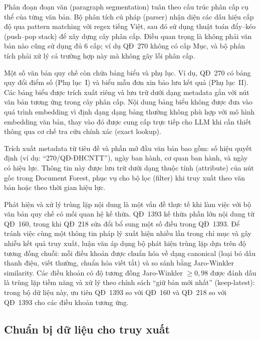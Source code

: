 Phân đoạn đoạn văn (paragraph segmentation) tuân theo cấu trúc phân cấp cụ thể
của từng văn bản. Bộ phân tích cú pháp (parser) nhận diện các dấu hiệu cấp độ
qua pattern matching với regex tiếng Việt, sau đó sử dụng thuật toán đẩy--kéo
(push--pop stack) để xây dựng cây phân cấp. Điều quan trọng là không phải văn
bản nào cũng sử dụng đủ 6 cấp; ví dụ QĐ~270 không có cấp Mục, và bộ phân tích
phải xử lý cả trường hợp này mà không gây lỗi phân cấp.

Một số văn bản quy chế còn chứa bảng biểu và phụ lục. Ví dụ, QĐ~270 có bảng
quy đổi điểm số (Phụ lục~I) và biểu mẫu đơn xin bảo lưu kết quả (Phụ lục~II).
Các bảng biểu được trích xuất riêng và lưu trữ dưới dạng metadata gắn với nút
văn bản tương ứng trong cây phân cấp. Nội dung bảng biểu không được đưa vào quá
trình embedding vì định dạng dạng bảng thường không phù hợp với mô hình embedding
văn bản, thay vào đó được cung cấp trực tiếp cho LLM khi cần thiết thông qua
cơ chế tra cứu chính xác (exact lookup).

Trích xuất metadata từ tiêu đề và phần mở đầu văn bản bao gồm: số hiệu quyết
định (ví dụ: ``270/QĐ-ĐHCNTT''), ngày ban hành, cơ quan ban hành, và ngày có
hiệu lực. Thông tin này được lưu trữ dưới dạng thuộc tính (attribute) của nút
gốc trong Document Forest, phục vụ cho bộ lọc (filter) khi truy xuất theo văn
bản hoặc theo thời gian hiệu lực.

Phát hiện và xử lý trùng lặp nội dung là một vấn đề thực tế khi làm việc với
bộ văn bản quy chế có mối quan hệ kế thừa. QĐ~1393 kế thừa phần lớn nội dung
từ QĐ~160, trong khi QĐ~218 sửa đổi bổ sung một số điều trong QĐ~1393. Để tránh
việc cùng một thông tin pháp lý xuất hiện nhiều lần trong chỉ mục và gây nhiễu
kết quả truy xuất, luận văn áp dụng bộ phát hiện trùng lặp dựa trên độ tương
đồng chuỗi: mỗi điều khoản được chuẩn hóa về dạng canonical (loại bỏ dấu thanh
điệu, viết thường, chuẩn hóa viết tắt) và so sánh bằng Jaro-Winkler similarity.
Các điều khoản có độ tương đồng Jaro-Winkler $\geq 0{,}98$ được đánh dấu là
trùng lặp tiềm năng và xử lý theo chính sách ``giữ bản mới nhất''
(keep-latest): trong bộ dữ liệu này, ưu tiên QĐ~1393 so với QĐ~160 và QĐ~218
so với QĐ~1393 cho các điều khoản tương ứng.

\subsection{Chuẩn bị dữ liệu cho truy xuất}
\label{subsec:chuan-bi-du-lieu}

